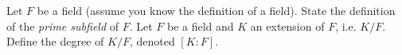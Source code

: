 \documentclass{exam}
\begin{document}
\begin{center}
\end{center}
\vspace*{1em}
\begin{questions}
    \question[3]
        Let $F$ be a field (assume you know the definition of a field). State the definition of the \textit{prime subfield} of $F$.
    \question[2]
        Let $F$ be a field and $K$ an extension of $F$, i.e. $K/F$. Define the degree of $K/F$, denoted $[K:F]$.
\end{questions}
\end{document}
